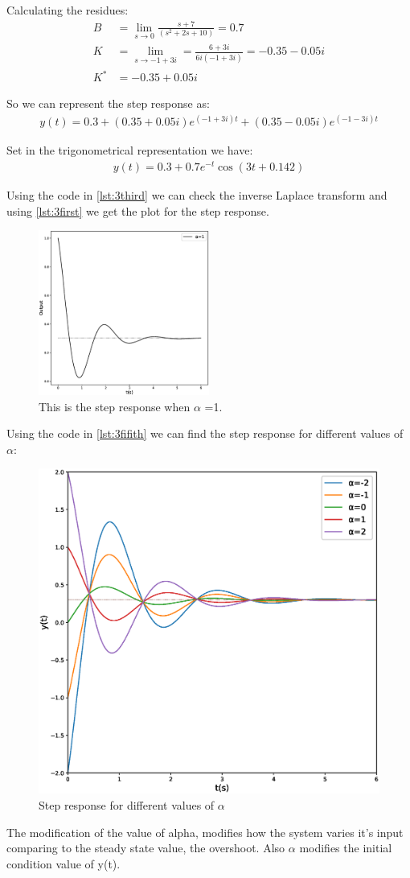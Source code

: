 \documentclass[a4paper,11pt]{article}
\begin{document}
\par Calculating the residues:
\begin{align*}
B &= \lim_{s \rightarrow 0}\frac{s+7}{(s^2+2s+10)}=0.7\\
K &= \lim_{s \rightarrow -1+3i} = \frac{6+3i}{6i(-1+3i)}=-0.35-0.05i\\
K^*&=-0.35+0.05i
\end{align*}
\par So we can represent the step response as:
\begin{align}
y(t)= 0.3+(0.35+0.05i)e^{(-1+3i)t}+(0.35-0.05i)e^{(-1-3i)t}
\end{align}
\par Set in the trigonometrical representation we have:
\begin{align}
y(t) = 0.3+0.7e^{-t}\cos(3t+0.142)
\end{align}
\par Using the code in \ref{lst:3third} we can check the inverse Laplace transform and using \ref{lst:3first} we get the plot for the step response.
\begin{figure}[H]
\centering
\includegraphics[width=0.5\textwidth]{Figures/Question3/3stepresponse.eps}
\caption{This is the step response when $\alpha$ =1.}
\end{figure}
\par Using the code in \ref{lst:3fifith} we can find the step response for different values of $\alpha$:
\begin{figure}[H]
\centering
\includegraphics[width=0.4\columnwidth]{Figures/Question3/difalfa.eps}
\caption{Step response for different values of $\alpha$}
\end{figure}
\par The modification of the value of alpha, modifies how the system varies it's input comparing to the steady state value, the overshoot. Also $\alpha$ modifies the initial condition value of y(t).  
\end{document}
